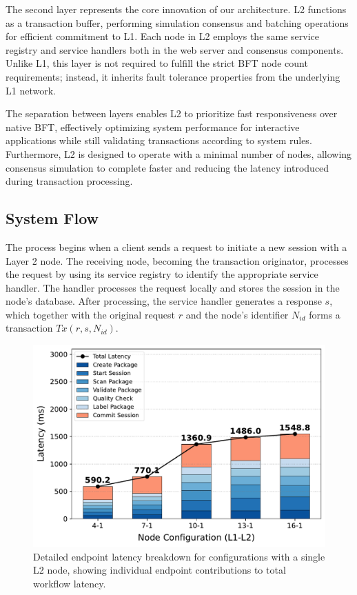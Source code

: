 \documentclass[conference]{IEEEtran}
\begin{document}
The second layer represents the core innovation of our architecture. L2 functions as a transaction buffer, performing simulation consensus and batching operations for efficient commitment to L1. Each node in L2 employs the same service registry and service handlers both in the web server and consensus components.
Unlike L1, this layer is not required to fulfill the strict BFT node count requirements; instead, it inherits fault tolerance properties from the underlying L1 network.%

The separation between layers enables L2 to prioritize fast responsiveness over native BFT, effectively optimizing system performance for interactive applications while still validating transactions according to system rules. Furthermore, L2 is designed to operate with a minimal number of nodes, allowing consensus simulation to complete faster and reducing the latency introduced during transaction processing.

\subsection{System Flow}

The process begins when a client sends a request to initiate a new session with a Layer 2 node. The receiving node, becoming the transaction originator, processes the request by using its service registry to identify the appropriate service handler. The handler processes the request locally and stores the session in the node's database. After processing, the service handler generates a response $s$, which together with the original request $r$ and the node's identifier $N_{id}$ forms a transaction $Tx(r, s, N_{id})$.

\begin{figure}[t]
    \centering
    \includegraphics[width=1\linewidth]{figure/ieee_stacked_latency_l1_l2_1.pdf}
    \caption{Detailed endpoint latency breakdown for configurations with a single L2 node, showing individual endpoint contributions to total workflow latency.}
    \label{fig:stacked-endpoints-l2-1}
\end{figure}
\end{document}
